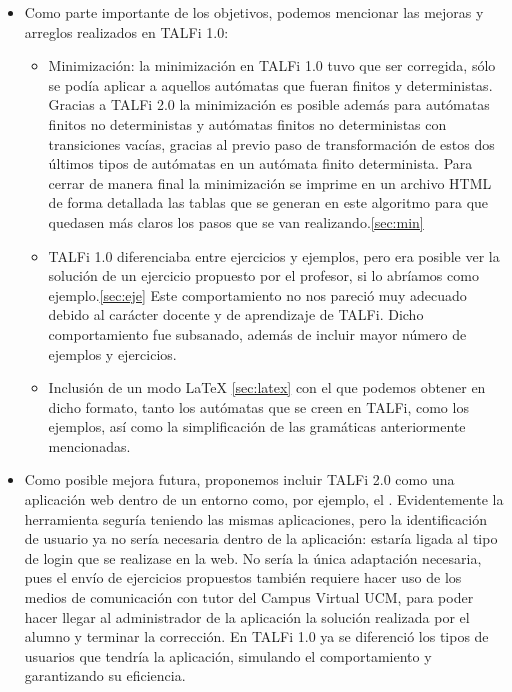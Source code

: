 \documentclass[12pt,a4paper,spanish]{book}
\begin{document}
\begin{itemize}
\item Como parte importante de los objetivos, podemos mencionar las mejoras y arreglos realizados en TALFi 1.0:
\begin{itemize}
\item Minimizaci\'on: la minimizaci\'on en TALFi 1.0 tuvo que ser corregida, s\'olo se pod\'ia aplicar a aquellos aut\'omatas que fueran finitos y deterministas. Gracias a TALFi 2.0 la minimizaci\'on es posible adem\'as para aut\'omatas finitos no deterministas y aut\'omatas finitos no deterministas con transiciones vac\'ias, gracias al previo paso de transformaci\'on de estos dos \'ultimos tipos de aut\'omatas en un aut\'omata finito determinista.
Para cerrar de manera final la minimizaci\'on se imprime en un archivo HTML de forma detallada las tablas que se generan en este algoritmo para que quedasen m\'as claros los pasos que se van realizando.\ref{sec:min}
\item TALFi 1.0 diferenciaba entre ejercicios y ejemplos, pero era posible ver la soluci\'on de un ejercicio propuesto por el profesor, si lo abr\'iamos como ejemplo.\ref{sec:eje} Este comportamiento no nos pareci\'o muy adecuado debido al car\'acter docente y de aprendizaje de TALFi. Dicho comportamiento fue subsanado, adem\'as de incluir mayor n\'umero de ejemplos y ejercicios.
\item Inclusi\'on de un modo \LaTeX{} \ref{sec:latex} con el que podemos obtener en dicho formato, tanto los aut\'omatas que se creen en TALFi, como los ejemplos, as\'i como la simplificaci\'on de las gram\'aticas anteriormente mencionadas.\\
\end{itemize}
\item Como posible mejora futura, proponemos incluir TALFi 2.0 como una aplicaci\'on web dentro de un entorno como, por ejemplo, el . Evidentemente la herramienta segur\'ia teniendo las mismas aplicaciones, pero la identificaci\'on de usuario ya no ser\'ia necesaria dentro de la aplicaci\'on: estar\'ia ligada al tipo de login que se realizase en la web.
No ser\'ia la \'unica adaptaci\'on necesaria, pues el env\'io de ejercicios propuestos tambi\'en requiere hacer uso de los medios de comunicaci\'on con tutor del Campus Virtual UCM, para poder hacer llegar al administrador de la aplicaci\'on la soluci\'on realizada por el alumno y terminar la correcci\'on.
En TALFi 1.0 ya se diferenci\'o los tipos de usuarios que tendr\'ia la aplicaci\'on, simulando el comportamiento y garantizando su eficiencia.
\end{itemize}
\end{document}
